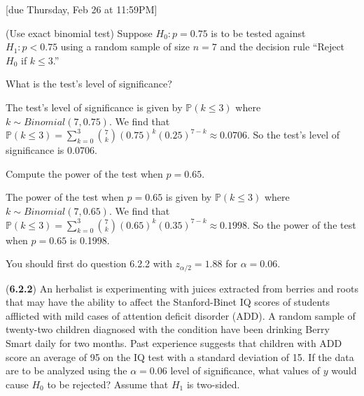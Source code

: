 \documentclass{article}
\renewcommand{\P}{\mathbb{P}}
\begin{document}
[due Thursday, Feb 26 at 11:59PM]

\begin{probset}
\begin{prob}[\textbf{6.3.9}]
    (Use exact binomial test) Suppose $H_0: p = 0.75$ is to be tested against $H_1: p < 0.75$ using a random sample of size $n = 7$ and the decision rule “Reject $H_0$ if $k \leq 3$.”

    \begin{subprobset}
    \begin{subprob}
        What is the test's level of significance?

        \begin{soln}
            The test's level of significance is given by $\P(k \leq 3)$ where $k \sim Binomial(7, 0.75)$. We find that $\P(k \leq 3) = \sum_{k=0}^{3} \binom{7}{k} (0.75)^k (0.25)^{7-k} \approx 0.0706$. So the test's level of significance is 0.0706.
        \end{soln}
    \end{subprob}

    \begin{subprob}
        Compute the power of the test when $p = 0.65$.

        \begin{soln}
            The power of the test when $p = 0.65$ is given by $\P(k \leq 3)$ where $k \sim Binomial(7, 0.65)$. We find that $\P(k \leq 3) = \sum_{k=0}^{3} \binom{7}{k} (0.65)^k (0.35)^{7-k} \approx 0.1998$. So the power of the test when $p = 0.65$ is 0.1998.
        \end{soln}
    \end{subprob}
    \end{subprobset}
\end{prob}

\begin{prob}
    You should first do question 6.2.2 with $z_{\alpha/2} = 1.88$ for $\alpha = 0.06$.

    \begin{subprobset}
    \begin{subprob}
        (\textbf{6.2.2}) An herbalist is experimenting with juices extracted from berries and roots that may have the ability to affect the Stanford-Binet IQ scores of students afflicted with mild cases of attention deficit disorder (ADD). A random sample of twenty-two children diagnosed with the condition have been drinking Berry Smart daily for two months. Past experience suggests that children with ADD score an average of 95 on the IQ test with a standard deviation of 15. If the data are to be analyzed using the $\alpha = 0.06$ level of significance, what values of $y$ would cause $H_0$ to be rejected? Assume that $H_1$ is two-sided.


\end{subprob}
\end{subprobset}
\end{prob}
\end{probset}
\end{document}
